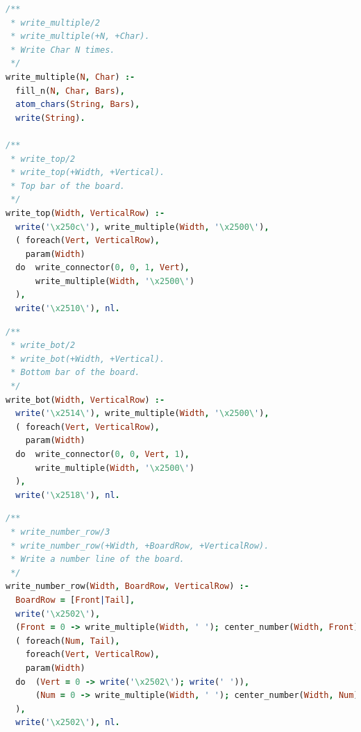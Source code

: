 \documentclass[runningheads]{llncs}
\begin{document}
\begin{center}
\begin{minipage}{0.85\textwidth}
\centering\ttfamily
\begin{lstlisting}[language=Prolog]
/**
 * write_multiple/2
 * write_multiple(+N, +Char).
 * Write Char N times.
 */
write_multiple(N, Char) :-
  fill_n(N, Char, Bars),
  atom_chars(String, Bars),
  write(String).

/**
 * write_top/2
 * write_top(+Width, +Vertical).
 * Top bar of the board. 
 */
write_top(Width, VerticalRow) :-
  write('\x250c\'), write_multiple(Width, '\x2500\'),
  ( foreach(Vert, VerticalRow),
    param(Width)
  do  write_connector(0, 0, 1, Vert),
      write_multiple(Width, '\x2500\')
  ),
  write('\x2510\'), nl.
\end{lstlisting}
\end{minipage}
\end{center}

\begin{center}
\begin{minipage}{0.85\textwidth}
\centering\ttfamily
\begin{lstlisting}[language=Prolog]
/**
 * write_bot/2
 * write_bot(+Width, +Vertical).
 * Bottom bar of the board.
 */
write_bot(Width, VerticalRow) :-
  write('\x2514\'), write_multiple(Width, '\x2500\'),
  ( foreach(Vert, VerticalRow),
    param(Width)
  do  write_connector(0, 0, Vert, 1),
      write_multiple(Width, '\x2500\')
  ),
  write('\x2518\'), nl.
\end{lstlisting}
\end{minipage}
\end{center}

\begin{center}
\begin{minipage}{0.85\textwidth}
\centering\ttfamily
\begin{lstlisting}[language=Prolog]
/**
 * write_number_row/3
 * write_number_row(+Width, +BoardRow, +VerticalRow).
 * Write a number line of the board.
 */
write_number_row(Width, BoardRow, VerticalRow) :-
  BoardRow = [Front|Tail],
  write('\x2502\'),
  (Front = 0 -> write_multiple(Width, ' '); center_number(Width, Front)),
  ( foreach(Num, Tail),
    foreach(Vert, VerticalRow),
    param(Width)
  do  (Vert = 0 -> write('\x2502\'); write(' ')),
      (Num = 0 -> write_multiple(Width, ' '); center_number(Width, Num))
  ),
  write('\x2502\'), nl.
\end{lstlisting}
\end{minipage}
\end{center}
  
\end{document}
